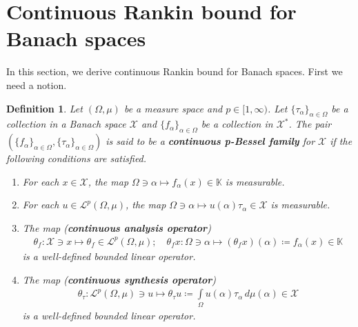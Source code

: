 \documentclass{amsart}
\newtheorem{definition}[theorem]{Definition}
\begin{document}
\section{Continuous Rankin bound for Banach spaces}
In this section, we derive continuous Rankin bound for Banach spaces. First we need a notion.
\begin{definition}\cite{KRISHNA2}
	Let $(\Omega, \mu)	$ be a measure space  and $p\in[1, \infty)$. Let $\{\tau_\alpha\}_{\alpha\in \Omega}$ be a collection  in a Banach space  $\mathcal{X}$ and 	$\{f_\alpha\}_{\alpha\in \Omega}$ be a collection in  $\mathcal{X}^*$. The pair $ (\{f_\alpha \}_{\alpha \in \Omega}, \{\tau_\alpha \}_{\alpha \in \Omega}) $ is said to be a \textbf{continuous p-Bessel family} for $\mathcal{X}$ if the following conditions are satisfied.
	\begin{enumerate}[\upshape(i)]
		\item For each $x \in \mathcal{X}$, the map $\Omega \ni \alpha \mapsto  f_\alpha(x)\in \mathbb{K}$ is measurable. 
		\item For each $u \in \mathcal{L}^p(\Omega, \mu)$, the map $\Omega \ni \alpha \mapsto  u(\alpha)\tau_\alpha \in \mathcal{X}$ is measurable. 
		\item The map  (\textbf{continuous analysis operator})
		\begin{align*}
			\theta_f: \mathcal{X}\ni x \mapsto \theta_f  \in \mathcal{L}^p(\Omega, \mu); \quad \theta_f x: \Omega \ni \alpha \mapsto (\theta_f x)(\alpha)\coloneqq f_\alpha(x)\in \mathbb{K} 
		\end{align*}
		is a well-defined bounded linear  operator.
		\item The map  (\textbf{continuous synthesis operator})
		\begin{align*}
			\theta_\tau : \mathcal{L}^p(\Omega, \mu)\ni u \mapsto \theta_\tau u\coloneqq \int\limits_\Omega u(\alpha)\tau_\alpha \,d\mu(\alpha)\in \mathcal{X}	
		\end{align*}
		is a well-defined bounded linear  operator.
	\end{enumerate}
\end{definition}
\end{document}
